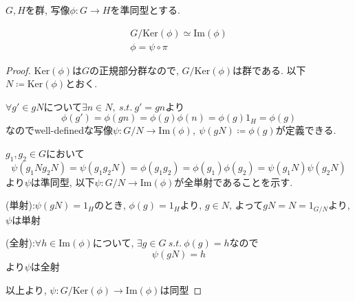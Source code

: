 \begin{theotcolorbox}[title = 準同型定理 (第一同型定理), sidebyside, righthand width = 4cm, lower separated=false]
    $G, H$を群, 写像$\phi:G \rightarrow H$を準同型とする.

    \begin{align*}
        G/\mathrm{Ker}(\phi) \simeq \mathrm{Im}(\phi)\\
        \phi = \psi \circ \pi
    \end{align*}

    \tcblower %

    \centering
\end{theotcolorbox}

\begin{proof}
    $\mathrm{Ker}(\phi)$は$G$の正規部分群なので, $G/\mathrm{Ker}(\phi)$は群である. 以下$N \coloneq \mathrm{Ker}(\phi)$とおく.
    
    $\forall g' \in g N$について$\exists n \in N,\ s.t.\ g' = gn$より
    \begin{equation*}
        \phi(g') = \phi(gn) = \phi(g)\phi(n) = \phi(g)1_H = \phi(g)
    \end{equation*}
    なのでwell-definedな写像$\psi:G/N \rightarrow \mathrm{Im}(\phi),\ \psi(gN) \coloneq \phi(g)$が定義できる.

    $g_1, g_2 \in G$において
    \begin{equation*}
        \psi(g_1 N g_2 N) = \psi(g_1g_2N) = \phi(g_1g_2) = \phi(g_1)\phi(g_2) = \psi(g_1N) \psi(g_2N)
    \end{equation*}
    より$\psi$は準同型, 以下$\psi:G/N \rightarrow \mathrm{Im}(\phi)$が全単射であることを示す.

    (単射):$\psi(gN) = 1_H$のとき, $\phi(g) = 1_H$より, $g \in N$, よって$gN = N = 1_{G/N}$より, $\psi$は単射

    (全射):$\forall h \in \mathrm{Im}(\phi)$について, $\exists g \in G\ s.t.\ \phi(g) = h$なので
    \begin{equation*}
        \psi(gN) = h
    \end{equation*}
    より$\psi$は全射

    以上より, $\psi:G/\mathrm{Ker}(\phi) \rightarrow \mathrm{Im}(\phi)$は同型
\end{proof}

